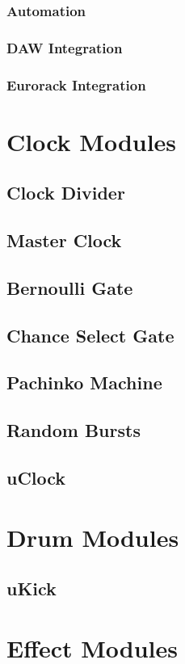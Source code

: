 \documentclass[11pt]{book}
\begin{document}
\subsection{Automation}
\subsection{DAW Integration}
\subsection{Eurorack Integration}


\chapter{Clock Modules}
\section{Clock Divider}
\section{Master Clock}
\section{Bernoulli Gate}
\section{Chance Select Gate}
\section{Pachinko Machine}
\section{Random Bursts}
\section{uClock}

\chapter{Drum Modules}
\section{uKick}

\chapter{Effect Modules}
\end{document}
